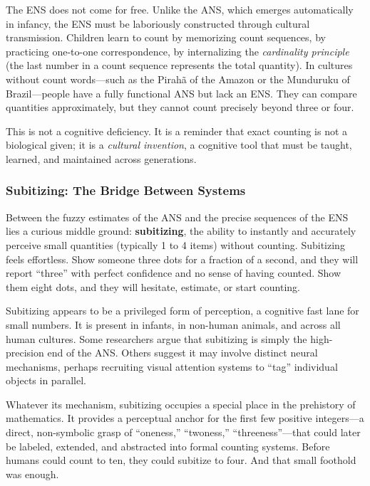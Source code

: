The ENS does not come for free. Unlike the ANS, which emerges automatically in infancy, the ENS must be laboriously constructed through cultural transmission. Children learn to count by memorizing count sequences, by practicing one-to-one correspondence, by internalizing the \textit{cardinality principle} (the last number in a count sequence represents the total quantity). In cultures without count words---such as the Pirahã of the Amazon or the Munduruku of Brazil---people have a fully functional ANS but lack an ENS. They can compare quantities approximately, but they cannot count precisely beyond three or four.

This is not a cognitive deficiency. It is a reminder that exact counting is not a biological given; it is a \textit{cultural invention}, a cognitive tool that must be taught, learned, and maintained across generations.

\subsubsection{Subitizing: The Bridge Between Systems}

Between the fuzzy estimates of the ANS and the precise sequences of the ENS lies a curious middle ground: \textbf{subitizing}, the ability to instantly and accurately perceive small quantities (typically 1 to 4 items) without counting. Subitizing feels effortless. Show someone three dots for a fraction of a second, and they will report ``three'' with perfect confidence and no sense of having counted. Show them eight dots, and they will hesitate, estimate, or start counting.

Subitizing appears to be a privileged form of perception, a cognitive fast lane for small numbers. It is present in infants, in non-human animals, and across all human cultures. Some researchers argue that subitizing is simply the high-precision end of the ANS. Others suggest it may involve distinct neural mechanisms, perhaps recruiting visual attention systems to ``tag'' individual objects in parallel.

Whatever its mechanism, subitizing occupies a special place in the prehistory of mathematics. It provides a perceptual anchor for the first few positive integers---a direct, non-symbolic grasp of ``oneness,'' ``twoness,'' ``threeness''---that could later be labeled, extended, and abstracted into formal counting systems. Before humans could count to ten, they could subitize to four. And that small foothold was enough.


